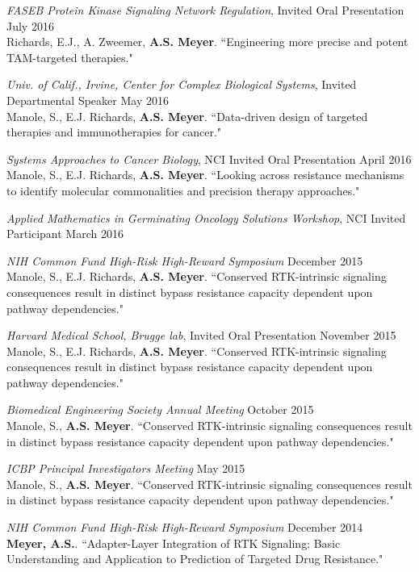 \documentclass[11pt]{res}
\begin{document}
\begin{resume}
{\sl FASEB Protein Kinase Signaling Network Regulation}, Invited Oral Presentation \hfill July 2016 \\
Richards, E.J., A. Zweemer, {\bf A.S. Meyer}. ``Engineering more precise and potent TAM-targeted therapies."

{\sl Univ. of Calif., Irvine, Center for Complex Biological Systems}, Invited Departmental Speaker \hfill May 2016 \\
Manole, S., E.J. Richards, {\bf A.S. Meyer}. ``Data-driven design of targeted therapies and immunotherapies for cancer."

{\sl Systems Approaches to Cancer Biology}, NCI Invited Oral Presentation \hfill April 2016 \\
Manole, S., E.J. Richards, {\bf A.S. Meyer}. ``Looking across resistance mechanisms to identify molecular commonalities and precision therapy approaches."

{\sl Applied Mathematics in Germinating Oncology Solutions Workshop}, NCI Invited Participant \hfill March 2016

{\sl NIH Common Fund High-Risk High-Reward Symposium} \hfill December 2015 \\
Manole, S., E.J. Richards, {\bf A.S. Meyer}. ``Conserved RTK-intrinsic signaling consequences result in distinct bypass resistance capacity dependent upon pathway dependencies."

{\sl Harvard Medical School, Brugge lab}, Invited Oral Presentation \hfill November 2015 \\
Manole, S., E.J. Richards, {\bf A.S. Meyer}. ``Conserved RTK-intrinsic signaling consequences result in distinct bypass resistance capacity dependent upon pathway dependencies."

{\sl Biomedical Engineering Society Annual Meeting} \hfill October 2015 \\
Manole, S., {\bf A.S. Meyer}. ``Conserved RTK-intrinsic signaling consequences result in distinct bypass resistance capacity dependent upon pathway dependencies."

{\sl ICBP Principal Investigators Meeting} \hfill May 2015 \\
Manole, S., {\bf A.S. Meyer}. ``Conserved RTK-intrinsic signaling consequences result in distinct bypass resistance capacity dependent upon pathway dependencies."

{\sl NIH Common Fund High-Risk High-Reward Symposium} \hfill December 2014 \\
{\bf Meyer, A.S.}. ``Adapter-Layer Integration of RTK Signaling: Basic Understanding and Application to Prediction of Targeted Drug Resistance."


\end{resume}
\end{document}
